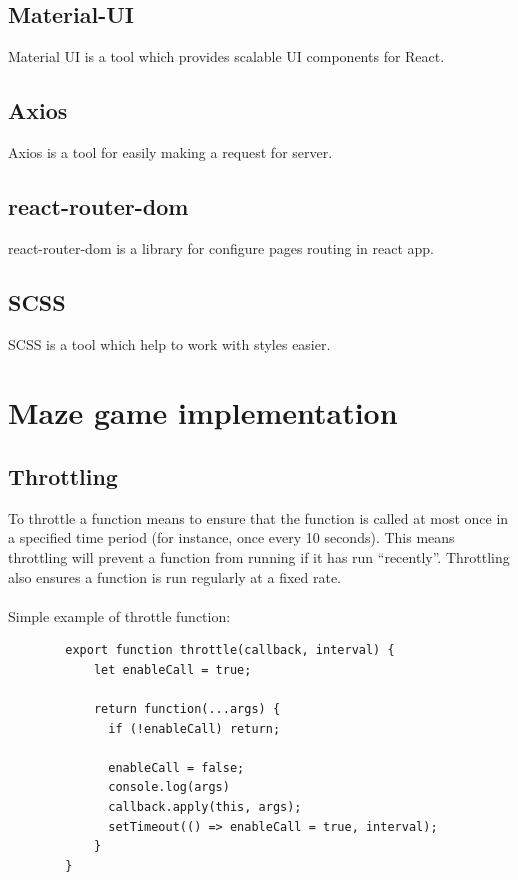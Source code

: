     \subsection{Material-UI}
    Material UI is a tool which provides scalable UI components for React.
    \subsection{Axios}
    Axios is a tool for easily making a request for server.
    \subsection{react-router-dom}
    react-router-dom is a library for configure pages routing in react app.
    \subsection{SCSS}
    SCSS is a tool which help to work with styles easier.

\section{Maze game implementation}
    \subsection{Throttling}
    To throttle a function means to ensure that the function is called at most once in a specified time period (for instance, once every 10 seconds). This means throttling will prevent a function from running if it has run “recently”. Throttling also ensures a function is run regularly at a fixed rate.
    \\\\Simple example of throttle function:
    \begin{lstlisting}
        export function throttle(callback, interval) {
            let enableCall = true;
          
            return function(...args) {
              if (!enableCall) return;
          
              enableCall = false;
              console.log(args)
              callback.apply(this, args);
              setTimeout(() => enableCall = true, interval);
            }
        }
		\end{lstlisting}


